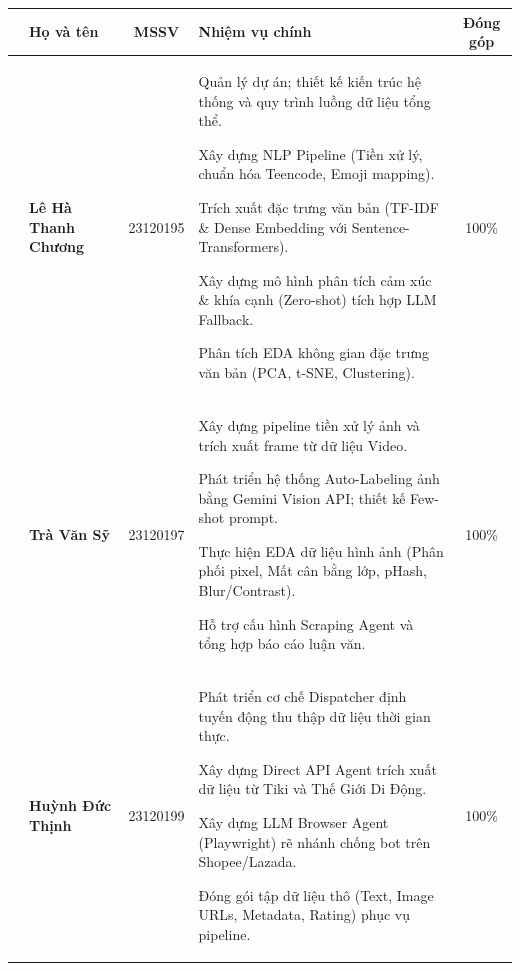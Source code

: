 \begin{center}
    \setcounter{memberrow}{0}
    \renewcommand{\arraystretch}{1.5}

    \begin{tabularx}{\textwidth}{|>{\stepcounter{memberrow}\thememberrow}c|p{3.5cm}|c|X|c|}
        \hline
        \rowcolor[HTML]{E8E8E8}
        \multicolumn{1}{|c|}{\textbf{STT}} & \centering\textbf{Họ và tên} & \textbf{MSSV} & \centering\textbf{Nhiệm vụ chính} & \textbf{Đóng góp} \\
        \hline

        & \textbf{Lê Hà Thanh Chương} & 23120195 &
        \begin{tableitemize}
            \item Quản lý dự án; thiết kế kiến trúc hệ thống và quy trình luồng dữ liệu tổng thể.
            \item Xây dựng NLP Pipeline (Tiền xử lý, chuẩn hóa Teencode, Emoji mapping).
            \item Trích xuất đặc trưng văn bản (TF-IDF \& Dense Embedding với Sentence-Transformers).
            \item Xây dựng mô hình phân tích cảm xúc \& khía cạnh (Zero-shot) tích hợp LLM Fallback.
            \item Phân tích EDA không gian đặc trưng văn bản (PCA, t-SNE, Clustering).
        \end{tableitemize} & 100\% \\ \hline

        & \textbf{Trà Văn Sỹ} & 23120197 &
        \begin{tableitemize}
            \item Xây dựng pipeline tiền xử lý ảnh và trích xuất frame từ dữ liệu Video.
            \item Phát triển hệ thống Auto-Labeling ảnh bằng Gemini Vision API; thiết kế Few-shot prompt.
            \item Thực hiện EDA dữ liệu hình ảnh (Phân phối pixel, Mất cân bằng lớp, pHash, Blur/Contrast).
            \item Hỗ trợ cấu hình Scraping Agent và tổng hợp báo cáo luận văn.
        \end{tableitemize} & 100\% \\ \hline

        & \textbf{Huỳnh Đức Thịnh} & 23120199 &
        \begin{tableitemize}
            \item Phát triển cơ chế Dispatcher định tuyến động thu thập dữ liệu thời gian thực.
            \item Xây dựng Direct API Agent trích xuất dữ liệu từ Tiki và Thế Giới Di Động.
            \item Xây dựng LLM Browser Agent (Playwright) rẽ nhánh chống bot trên Shopee/Lazada.
            \item Đóng gói tập dữ liệu thô (Text, Image URLs, Metadata, Rating) phục vụ pipeline.
        \end{tableitemize} & 100\% \\ \hline


\end{tabularx}
\end{center}

